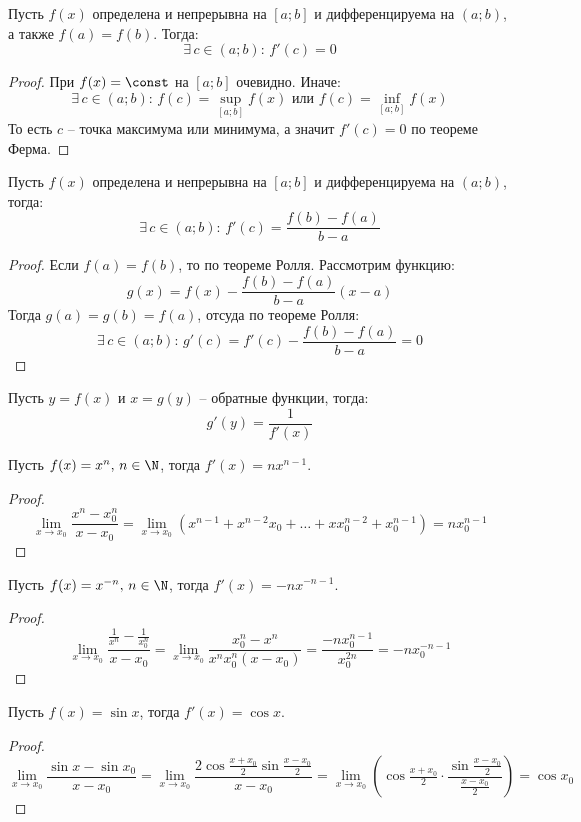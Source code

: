 \documentclass[12pt]{article}
\begin{document}
\begin{theorem}[Ролля]
    Пусть $f(x)$ определена и непрерывна на $\left[a;b\right]$ и дифференцируема на $(a;b)$, а также $f(a)=f(b)$. Тогда:
    $$\exists\,c\in(a;b):\,f'(c)=0$$
\end{theorem}
\begin{proof}
    При $f(x)=\const$ на $\left[a;b\right]$ очевидно. Иначе:
    $$\exists\,c\in(a;b):\,f(c)=\sup\limits_{\left[a;b\right]}f(x)\text{ или }f(c)=\inf\limits_{\left[a;b\right]}f(x)$$
    То есть $c$ -- точка максимума или минимума, а значит $f'(c)=0$ по теореме Ферма.
\end{proof}
\begin{theorem}[Лагранжа]
    Пусть $f(x)$ определена и непрерывна на $\left[a;b\right]$ и дифференцируема на $(a;b)$, тогда:
    $$\exists\,c\in(a;b):\,f'(c)=\frac{f(b)-f(a)}{b-a}$$
\end{theorem}
\begin{proof}
    Если $f(a)=f(b)$, то по теореме Ролля. Рассмотрим функцию:
    $$g(x)=f(x)-\frac{f(b)-f(a)}{b-a}(x-a)$$
    Тогда $g(a)=g(b)=f(a)$, отсуда по теореме Ролля:
    $$\exists\,c\in(a;b):\,g'(c)=f'(c)-\frac{f(b)-f(a)}{b-a}=0$$
\end{proof}
\begin{theorem}
    Пусть $y=f(x)$ и $x=g(y)$ -- обратные функции, тогда:
    $$g'(y)=\frac{1}{f'(x)}$$
\end{theorem}
\begin{statement}
    Пусть $f(x)=x^n,\,n\in\N$, тогда $f'(x)=nx^{n-1}$.
\end{statement}
\begin{proof}
    $$\lim_{x\to x_0}\frac{x^n-x_0^n}{x-x_0}=\lim_{x\to x_0}(x^{n-1}+x^{n-2}x_0+\ldots+xx_0^{n-2}+x_0^{n-1})=nx_0^{n-1}$$
\end{proof}
\begin{statement}
    Пусть $f(x)=x^{-n},\,n\in\N$, тогда $f'(x)=-nx^{-n-1}$.
\end{statement}
\begin{proof}
    $$\lim_{x\to x_0}\frac{\frac{1}{x^n}-\frac{1}{x_0^n}}{x-x_0}=\lim_{x\to x_0}\frac{x_0^n-x^n}{x^nx_0^n(x-x_0)}=\frac{-nx_0^{n-1}}{x_0^{2n}}=-nx_0^{-n-1}$$
\end{proof}
\begin{statement}
    Пусть $f(x)=\sin x$, тогда $f'(x)=\cos x$.
\end{statement}
\begin{proof}
    $$\lim_{x\to x_0}\frac{\sin x-\sin x_0}{x-x_0}=\lim_{x\to x_0}\frac{2\cos\frac{x+x_0}{2}\sin\frac{x-x_0}{2}}{x-x_0}=\lim_{x\to x_0}\left(\cos\tfrac{x+x_0}{2}\cdot\frac{\sin\frac{x-x_0}{2}}{\frac{x-x_0}{2}}\right)=\cos x_0$$
\end{proof}
\end{document}
